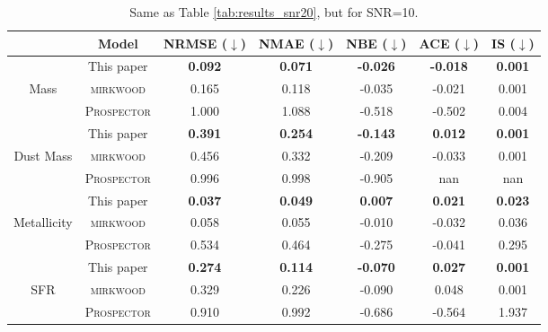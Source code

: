 \documentclass[letterpaper]{article} %
\begin{document}
\begin{table*}
\centering
\begin{tabular}{ccccccc}
\toprule
\toprule
& Model &  NRMSE ($\downarrow$) & NMAE ($\downarrow$) & NBE ($\downarrow$) & ACE ($\downarrow$) & IS ($\downarrow$) \\ \midrule
& This paper  &  \textbf{0.092}&  \textbf{0.071}&  \textbf{-0.026}&  \textbf{-0.018}&  \textbf{0.001}\\
Mass & \textsc{mirkwood} &    0.165&  0.118&  -0.035&  -0.021&  0.001\\
& \textsc{Prospector} &  1.000&  1.088&  -0.518&   -0.502&  0.004\\ \midrule
& This paper  &    \textbf{0.391}&   \textbf{0.254}&  \textbf{-0.143}&   \textbf{0.012}&  \textbf{0.001}\\
Dust Mass & \textsc{mirkwood} &  0.456&  0.332&  -0.209&  -0.033& 0.001 \\
& \textsc{Prospector} &  0.996&  0.998& -0.905&  nan &  nan \\ \midrule
& This paper&  \textbf{0.037}&   \textbf{0.049}&  \textbf{0.007}&  \textbf{0.021}&  \textbf{0.023}\\
Metallicity & \textsc{mirkwood}&  0.058&  0.055&   -0.010&  -0.032&  0.036\\
& \textsc{Prospector}&  0.534&  0.464&   -0.275&  -0.041&  0.295\\ \midrule
& This paper&  \textbf{0.274}&   \textbf{0.114}&  \textbf{-0.070}&  \textbf{0.027}&  \textbf{0.001}\\
SFR & \textsc{mirkwood}&   0.329&  0.226&   -0.090&  0.048&  0.001\\
& \textsc{Prospector}&  0.910&  0.992&   -0.686&  -0.564&    1.937\\ \bottomrule
\end{tabular}
\caption{Same as Table \ref{tab:results_snr20}, but for SNR=10.}
\label{tab:results_snr10}
\end{table*}
\end{document}
